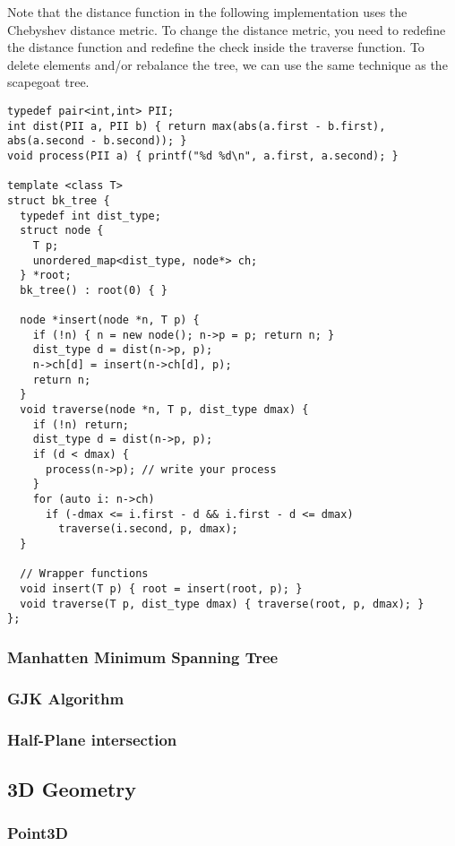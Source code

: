 Note that the distance function in the following implementation uses the Chebyshev distance metric.
To change the distance metric, you need to redefine the distance function and redefine the check
inside the traverse function. To delete elements and/or rebalance the tree,
we can use the same technique as the scapegoat tree.

\begin{lstlisting}
typedef pair<int,int> PII;
int dist(PII a, PII b) { return max(abs(a.first - b.first), abs(a.second - b.second)); }
void process(PII a) { printf("%d %d\n", a.first, a.second); }

template <class T>
struct bk_tree {
  typedef int dist_type;
  struct node {
    T p;
    unordered_map<dist_type, node*> ch;
  } *root;
  bk_tree() : root(0) { }

  node *insert(node *n, T p) {
    if (!n) { n = new node(); n->p = p; return n; }
    dist_type d = dist(n->p, p);
    n->ch[d] = insert(n->ch[d], p);
    return n;
  }
  void traverse(node *n, T p, dist_type dmax) {
    if (!n) return;
    dist_type d = dist(n->p, p);
    if (d < dmax) {
      process(n->p); // write your process
    }
    for (auto i: n->ch) 
      if (-dmax <= i.first - d && i.first - d <= dmax) 
        traverse(i.second, p, dmax);
  }

  // Wrapper functions
  void insert(T p) { root = insert(root, p); }
  void traverse(T p, dist_type dmax) { traverse(root, p, dmax); }
};
\end{lstlisting}

\newpage

\subsubsection{Manhatten Minimum Spanning Tree}
\subsubsection{GJK Algorithm}
\subsubsection{Half-Plane intersection}
\subsection{3D Geometry}
\subsubsection{Point3D}
